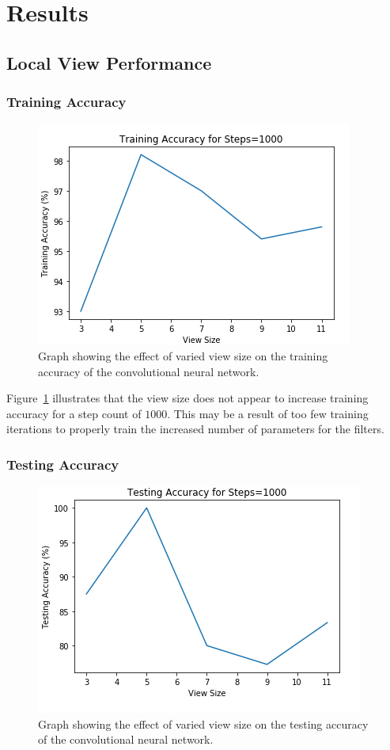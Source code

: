 \documentclass{article}
\begin{document}
\section{Results}
\subsection{Local View Performance}
\subsubsection*{Training Accuracy}
\begin{figure}[ht]
\centering
  \includegraphics[width=0.6\linewidth]{trainingAccuracy_view}
  \caption{Graph showing the effect of varied view size on the training accuracy of the convolutional neural network.}
  \label{fig:trainingAccuracy_view}
\end{figure}
Figure~\ref{fig:trainingAccuracy_view} illustrates that the view size does not appear to increase training accuracy for a step count of $1000$. This may be a result of too few training iterations to properly train the increased number of parameters for the filters.

\subsubsection*{Testing Accuracy}
\begin{figure}[ht]
\centering
  \includegraphics[width=0.6\linewidth]{testingAccuracy_view}
  \caption{Graph showing the effect of varied view size on the testing accuracy of the convolutional neural network.}
  \label{fig:testingAccuracy_view}
\end{figure}
\end{document}
